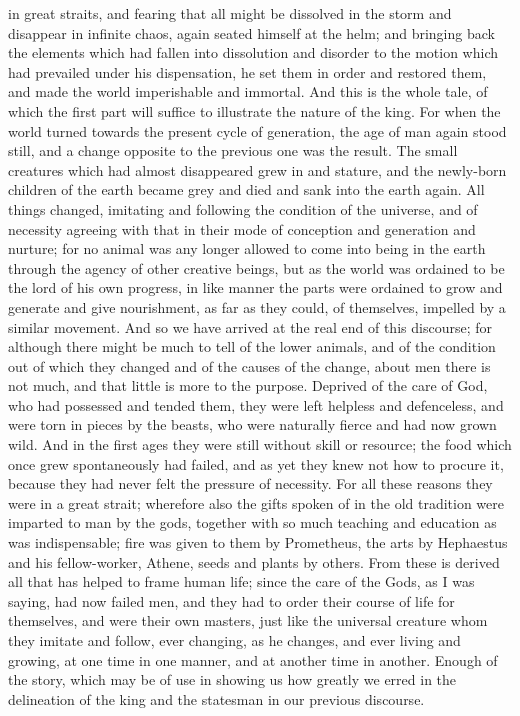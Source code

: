 \documentclass[11pt,letter]{article}
\begin{document}
in great straits, and fearing that all might be dissolved in the storm and disappear in infinite chaos, again seated himself at the helm; and bringing back the elements which had fallen into dissolution and disorder to the motion which had prevailed under his dispensation, he set them in order and restored them, and made the world imperishable and immortal. And this is the whole tale, of which the first part will suffice to illustrate the nature of the king. For when the world turned towards the present cycle of generation, the age of man again stood still, and a change opposite to the previous one was the result. The small creatures which had almost disappeared grew in and stature, and the newly-born children of the earth became grey and died and sank into the earth again. All things changed, imitating and following the condition of the universe, and of necessity agreeing with that in their mode of conception and generation and nurture; for no animal was any longer allowed to come into being in the earth through the agency of other creative beings, but as the world was ordained to be the lord of his own progress, in like manner the parts were ordained to grow and generate and give nourishment, as far as they could, of themselves, impelled by a similar movement. And so we have arrived at the real end of this discourse; for although there might be much to tell of the lower animals, and of the condition out of which they changed and of the causes of the change, about men there is not much, and that little is more to the purpose. Deprived of the care of God, who had possessed and tended them, they were left helpless and defenceless, and were torn in pieces by the beasts, who were naturally fierce and had now grown wild. And in the first ages they were still without skill or resource; the food which once grew spontaneously had failed, and as yet they knew not how to procure it, because they had never felt the pressure of necessity. For all these reasons they were in a great strait; wherefore also the gifts spoken of in the old tradition were imparted to man by the gods, together with so much teaching and education as was indispensable; fire was given to them by Prometheus, the arts by Hephaestus and his fellow-worker, Athene, seeds and plants by others. From these is derived all that has helped to frame human life; since the care of the Gods, as I was saying, had now failed men, and they had to order their course of life for themselves, and were their own masters, just like the universal creature whom they imitate and follow, ever changing, as he changes, and ever living and growing, at one time in one manner, and at another time in another. Enough of the story, which may be of use in showing us how greatly we erred in the delineation of the king and the statesman in our previous discourse.
\end{document}
